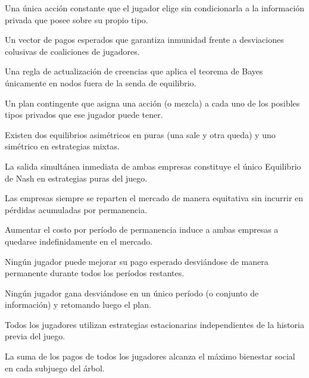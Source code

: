 \begin{opts}
    \item Una única acción constante que el jugador elige sin condicionarla a la información privada que posee sobre su propio tipo.
    \item Un vector de pagos esperados que garantiza inmunidad frente a desviaciones colusivas de coaliciones de jugadores.
    \item Una regla de actualización de creencias que aplica el teorema de Bayes únicamente en nodos fuera de la senda de equilibrio.
    \item Un plan contingente que asigna una acción (o mezcla) a cada uno de los posibles tipos privados que ese jugador puede tener.
\end{opts}

\begin{opts}
    \item Existen dos equilibrios asimétricos en puras (una sale y otra queda) y uno simétrico en estrategias mixtas.
    \item La salida simultánea inmediata de ambas empresas constituye el único Equilibrio de Nash en estrategias puras del juego.
    \item Las empresas siempre se reparten el mercado de manera equitativa sin incurrir en pérdidas acumuladas por permanencia.
    \item Aumentar el costo por período de permanencia induce a ambas empresas a quedarse indefinidamente en el mercado.
\end{opts}

\begin{opts}
    \item Ningún jugador puede mejorar su pago esperado desviándose de manera permanente durante todos los períodos restantes.
    \item Ningún jugador gana desviándose en un único período (o conjunto de información) y retomando luego el plan.
    \item Todos los jugadores utilizan estrategias estacionarias independientes de la historia previa del juego.
    \item La suma de los pagos de todos los jugadores alcanza el máximo bienestar social en cada subjuego del árbol.
\end{opts}


